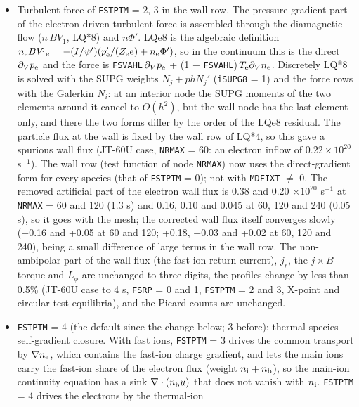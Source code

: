 \documentclass[11pt]{article}
\def\r#1{{\rm#1}}
\def\nee{n_\r{e}}
\begin{document}
\begin{itemize}
  15\%), the core impurity density by 25--55\%.  \texttt{FSTPTM} = 2 remains
  available and must be given for every species (\texttt{FSTPTM} = 2, 2, 2).
\item Turbulent force of \texttt{FSTPTM} = 2, 3 in the wall row.  The pressure-gradient part
  of the electron-driven turbulent force is assembled through the diamagnetic flow
  ($n\,BV_1$, LQ*8) and $n\Phi'$.  LQe8 is the algebraic definition
  $n_\r{e}BV_{1\r{e}} = -(I/\psi')(p_\r{e}'/(Z_\r{e}e) + n_\r{e}\Phi')$, so in the continuum this is
  the direct $\partial_V p_\r{e}$ and the force is
  \texttt{FSVAHL}\,$\partial_V p_\r{e}$ + (1 $-$ \texttt{FSVAHL})\,$T_\r{e}\partial_V\nee$.  Discretely
  LQ*8 is solved with the SUPG weights $N_j + p h N_j'$ (\texttt{iSUPG8} = 1) and the force rows
  with the Galerkin $N_i$: at an interior node the SUPG moments of the two elements around it
  cancel to $O(h^2)$, but the wall node has the last element only, and there the two forms
  differ by the order of the LQe8 residual.  The particle flux at the wall is fixed by the
  wall row of LQ*4, so this gave a spurious wall flux (JT-60U case, \texttt{NRMAX} = 60: an
  electron inflow of $0.22\times10^{20}$ s$^{-1}$).  The wall row (test function of node
  \texttt{NRMAX}) now uses the direct-gradient form for every species (that of
  \texttt{FSTPTM} = 0); not with \texttt{MDFIXT} $\neq$ 0.  The removed artificial part of the
  electron wall flux is 0.38 and 0.20 $\times10^{20}$ s$^{-1}$ at \texttt{NRMAX} = 60 and 120 (1.3 s) and 0.16, 0.10 and 0.045 at 60, 120 and 240 (0.05 s), so it goes with the mesh; the
  corrected wall flux itself converges slowly (+0.16 and +0.05 at 60 and 120; +0.18, +0.03 and +0.02 at 60, 120 and 240), being a small
  difference of large terms in the wall row.  The non-ambipolar part of the wall flux (the
  fast-ion return current), $j_r$, the $j\times B$ torque and $L_\phi$ are unchanged to three
  digits, the profiles change by less than 0.5\% (JT-60U case to 4 s, \texttt{FSRP} = 0 and 1,
  \texttt{FSTPTM} = 2 and 3, X-point and circular test equilibria), and the Picard counts are
  unchanged.
\item \texttt{FSTPTM} = 4 (the default since the change below; 3 before): thermal-species self-gradient closure.
  With fast ions, \texttt{FSTPTM} = 3 drives the common transport by $\nabla\nee$, which contains the
  fast-ion charge gradient, and lets the main ions carry the fast-ion share of the electron flux
  (weight $n_\r{i}+n_\r{b}$), so the main-ion continuity equation has a sink $\nabla\cdot(n_\r{b}u)$
  that does not vanish with $n_\r{i}$.  \texttt{FSTPTM} = 4 drives the electrons by the thermal-ion

\end{itemize}
\end{document}

